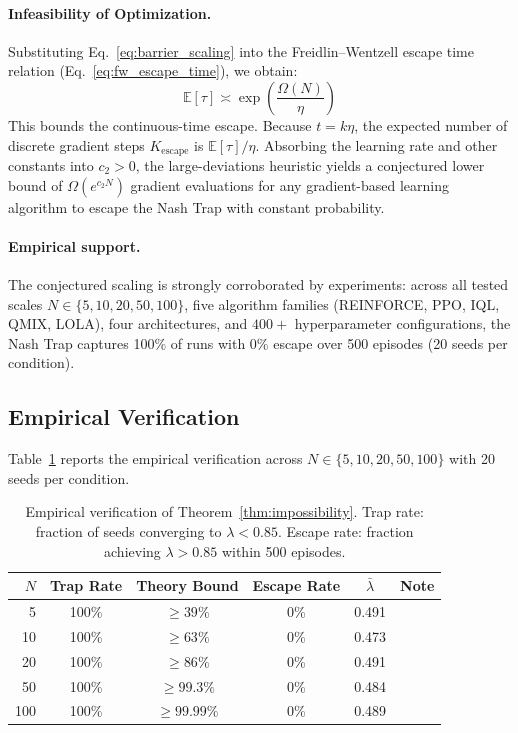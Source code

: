 \paragraph{Infeasibility of Optimization.}
Substituting Eq.~\ref{eq:barrier_scaling} into the Freidlin--Wentzell escape time relation (Eq.~\ref{eq:fw_escape_time}), we obtain:
\begin{equation}
\mathbb{E}[\tau] \asymp \exp\left( \frac{\Omega(N)}{\eta} \right)
\end{equation}
This bounds the continuous-time escape. Because $t = k\eta$, the expected number of discrete gradient steps $K_{\mathrm{escape}}$ is $\mathbb{E}[\tau] / \eta$. Absorbing the learning rate and other constants into $c_2 > 0$, the large-deviations heuristic yields a conjectured lower bound of $\Omega(e^{c_2 N})$ gradient evaluations for any gradient-based learning algorithm to escape the Nash Trap with constant probability.

\paragraph{Empirical support.}
The conjectured scaling is strongly corroborated by experiments: across all tested scales $N \in \{5, 10, 20, 50, 100\}$, five algorithm families (REINFORCE, PPO, IQL, QMIX, LOLA), four architectures, and $400{+}$ hyperparameter configurations, the Nash Trap captures 100\% of runs with 0\% escape over 500 episodes (20 seeds per condition).
\qedhere


\subsection{Empirical Verification}
\label{app:impossibility_empirical}

Table~\ref{tab:impossibility_empirical} reports the
empirical verification across $N \in \{5, 10, 20, 50, 100\}$
with 20 seeds per condition.

\begin{table}[h]
\centering
\caption{Empirical verification of Theorem~\ref{thm:impossibility}.
  Trap rate: fraction of seeds converging to $\lambda < 0.85$.
  Escape rate: fraction achieving $\lambda > 0.85$ within 500 episodes.}
\label{tab:impossibility_empirical}
\small
\begin{tabular}{@{}rccccl@{}}
\toprule
$N$ & Trap Rate & Theory Bound & Escape Rate & $\bar{\lambda}$ & Note \\
\midrule
5   & 100\%  & $\geq 39\%$  & 0\%  & 0.491 & \\
10  & 100\%  & $\geq 63\%$  & 0\%  & 0.473 & \\
20  & 100\%  & $\geq 86\%$  & 0\%  & 0.491 & \\
50  & 100\%  & $\geq 99.3\%$& 0\%  & 0.484 & \\
100 & 100\%  & $\geq 99.99\%$& 0\% & 0.489 & \\
\bottomrule
\end{tabular}
\end{table}

